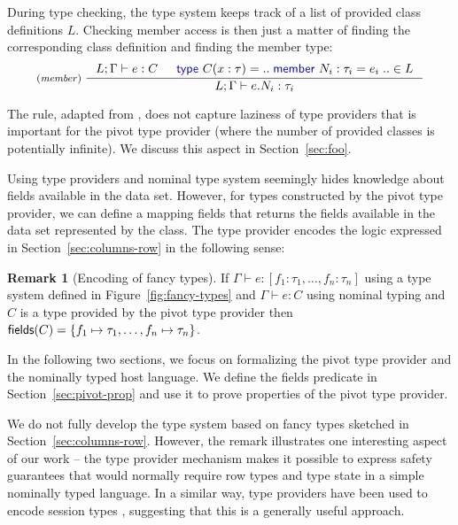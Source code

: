\documentclass[a4paper,UKenglish]{lipics-v2016}
\theoremstyle{plain}
\theoremstyle{definition}
\newtheorem{rmrk}{Remark}
\newcommand{\kvd}[1]{\textnormal{\textcolor{kvdclr}{\sffamily #1}}}
\newcommand{\ident}[1]{\textnormal{\sffamily #1}}
\begin{document}
\noindent
During type checking, the type system keeps track of a list of provided class definitions $L$. 
Checking member access is then just a matter of finding the corresponding class definition and
finding the member type:
%
\begin{equation*}
\inference[(\emph{member})~]
  {L; \Gamma \vdash e : C & \kvd{type}~C(x:\tau) = ..\;\kvd{member}~N_i : \tau_i = e_i\;.. \in L}
  {L; \Gamma \vdash e.N_i:\tau_i}
\end{equation*}

\noindent
The rule, adapted from \cite{fsdata}, does not capture laziness of type providers that is 
important for the pivot type provider (where the number of provided classes is potentially 
infinite). We discuss this aspect in Section~\ref{sec:foo}.

Using type providers and nominal type system seemingly hides knowledge about fields available
in the data set. However, for types constructed by the pivot type provider, we can define a 
mapping \ident{fields} that returns the fields available in the data set represented by the 
class. The type provider encodes the logic expressed in Section~\ref{sec:columns-row} in the
following sense:

\begin{rmrk}[Encoding of fancy types]
\label{thm:encoding-fancy}
If $\Gamma\vdash e:[f_1\!:\!\tau_1, \ldots, f_n\!:\!\tau_n]$ using a type system defined in 
Figure~\ref{fig:fancy-types} and $\Gamma\vdash e:C$ using nominal typing and $C$ is a type 
provided by the pivot type provider then $\ident{fields}(C) = \{ f_1\mapsto\tau_1, \ldots, f_n\mapsto\tau_n \}$.
\end{rmrk}

\noindent
In the following two sections, we focus on formalizing the pivot type provider and the nominally 
typed host language. We define the \ident{fields} predicate in Section~\ref{sec:pivot-prop} and use it 
to prove properties of the pivot type provider.

We do not fully develop the type system based on fancy types sketched in Section~\ref{sec:columns-row}.
However, the remark illustrates one interesting aspect of our work -- the type provider 
mechanism makes it possible to express safety guarantees that would normally require row types and 
type state in a simple nominally typed language. In a similar way, type providers have been used
to encode session types \cite{sessiontp}, suggesting that this is a generally useful approach.

\end{document}
